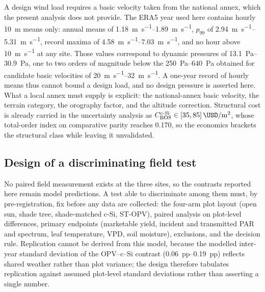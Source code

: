 \documentclass[preprint,12pt,a4paper]{elsarticle}
\begin{document}
A design wind load requires a basic velocity taken from the national annex, which the present analysis does not provide. The ERA5 year used here contains hourly \qty{10}{\meter} means only: annual means of \qtyrange{1.18}{1.89}{\meter\per\second}, $p_{99}$ of \qtyrange{2.94}{5.31}{\meter\per\second}, record maxima of \qtyrange{4.58}{7.03}{\meter\per\second}, and no hour above \qty{10}{\meter\per\second} at any site. Those values correspond to dynamic pressures of \qtyrange{13.1}{30.9}{\pascal}, one to two orders of magnitude below the \qtyrange{250}{640}{\pascal} obtained for candidate basic velocities of \qtyrange{20}{32}{\meter\per\second}. A one-year record of hourly means thus cannot bound a design load, and no design pressure is asserted here. What a local annex must supply is explicit: the national-annex basic velocity, the terrain category, the orography factor, and the altitude correction. Structural cost is already carried in the uncertainty analysis as $C_{\mathrm{BOS}}^{\mathrm{c\text{-}Si}}\in[\num{35},\num{85}]\,\unit{\USD\per\square\meter}$, whose total-order index on comparative parity reaches \num{0.170}, so the economics brackets the structural class while leaving it unvalidated.

\subsection{Design of a discriminating field test}
\label{sec:sm_field_design}

No paired field measurement exists at the three sites, so the contrasts reported here remain model predictions. A test able to discriminate among them must, by pre-registration, fix before any data are collected: the four-arm plot layout (open sun, shade tree, shade-matched c-Si, ST-OPV), paired analysis on plot-level differences, primary endpoints (marketable yield, incident and transmitted PAR and spectrum, leaf temperature, VPD, soil moisture), exclusions, and the decision rule. Replication cannot be derived from this model, because the modelled inter-year standard deviation of the OPV--c--Si contrast (\qtyrange{0.06}{0.19}{pp}) reflects shared weather rather than plot variance; the design therefore tabulates replication against assumed plot-level standard deviations rather than asserting a single number.



\end{document}
